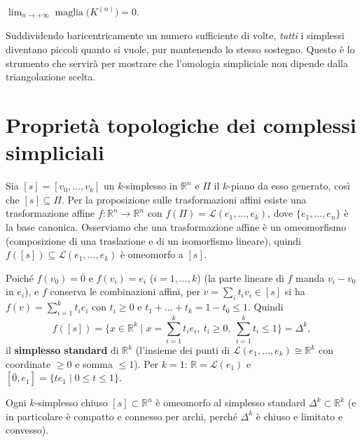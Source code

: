 \begin{coro}
$\displaystyle \lim_{n \to +\infty} \operatorname{maglia}\big(K^{(n)}\big) = 0$.
\end{coro}

\begin{intuizione}
Suddividendo baricentricamente un numero sufficiente di volte, \emph{tutti} i simplessi diventano piccoli quanto si vuole, pur mantenendo lo stesso sostegno. Questo \`e lo strumento che servir\`a per mostrare che l'omologia simpliciale non dipende dalla triangolazione scelta.
\end{intuizione}

\section{Propriet\`a topologiche dei complessi simpliciali}

Sia $[s] = [v_0, \dots, v_k]$ un $k$-simplesso in $\mathbb{R}^n$ e $\Pi$ il $k$-piano da esso generato, cos\`i che $[s] \subseteq \Pi$. Per la proposizione sulle trasformazioni affini esiste una trasformazione affine $f: \mathbb{R}^n \to \mathbb{R}^n$ con $f(\Pi) = \mathcal{L}(e_1, \dots, e_k)$, dove $\{e_1, \dots, e_n\}$ \`e la base canonica. Osserviamo che una trasformazione affine \`e un omeomorfismo (composizione di una traslazione e di un isomorfismo lineare), quindi $f([s]) \subseteq \mathcal{L}(e_1, \dots, e_k)$ \`e omeomorfo a $[s]$.

Poich\'e $f(v_0) = \bar{0}$ e $f(v_i) = e_i$ ($i = 1, \dots, k$) (la parte lineare di $f$ manda $v_i - v_0$ in $e_i$), e $f$ conserva le combinazioni affini, per $v = \sum_i t_i v_i \in [s]$ si ha $f(v) = \sum_{i=1}^k t_i e_i$ con $t_i \geqslant 0$ e $t_1 + \dots + t_k = 1 - t_0 \leqslant 1$. Quindi
\[
f([s]) = \Big\{ x \in \mathbb{R}^k \;\Big|\; x = \sum_{i=1}^k t_i e_i,\ t_i \geqslant 0,\ \sum_{i=1}^k t_i \leqslant 1 \Big\} = \Delta^k,
\]
il \textbf{simplesso standard} di $\mathbb{R}^k$ (l'insieme dei punti di $\mathcal{L}(e_1, \dots, e_k) \cong \mathbb{R}^k$ con coordinate $\geqslant 0$ e somma $\leqslant 1$). Per $k = 1$: $\mathbb{R} = \mathcal{L}(e_1)$ e $[\bar{0}, e_1] = \{ t e_1 \mid 0 \leqslant t \leqslant 1 \}$.

\begin{prop}
Ogni $k$-simplesso chiuso $[s] \subset \mathbb{R}^n$ \`e omeomorfo al simplesso standard $\Delta^k \subset \mathbb{R}^k$ (e in particolare \`e compatto e connesso per archi, perch\'e $\Delta^k$ \`e chiuso e limitato e convesso).
\end{prop}


